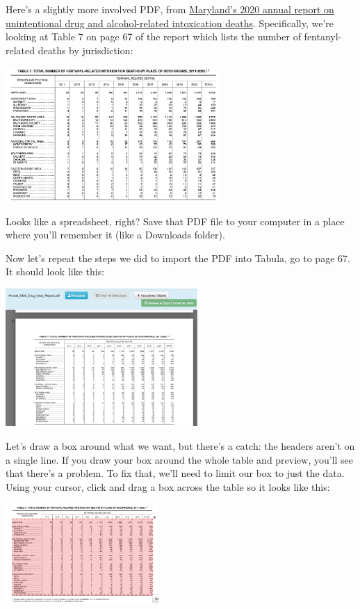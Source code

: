 \documentclass[
  letterpaper,
  DIV=11,
  numbers=noendperiod]{scrreprt}
\begin{document}
Here's a slightly more involved PDF, from
\href{https://health.maryland.gov/vsa/Documents/Overdose/Annual_2020_Drug_Intox_Report.pdf}{Maryland's
2020 annual report on unintentional drug and alcohol-related
intoxication deaths}. Specifically, we're looking at Table 7 on page 67
of the report which lists the number of fentanyl-related deaths by
jurisdiction:

\includegraphics[width=3.2in,height=\textheight]{./images/md_fentanyl_deaths_1.png}

Looks like a spreadsheet, right? Save that PDF file to your computer in
a place where you'll remember it (like a Downloads folder).

Now let's repeat the steps we did to import the PDF into Tabula, go to
page 67. It should look like this:

\includegraphics[width=2.88in,height=\textheight]{./images/md_fentanyl_deaths_2.png}

Let's draw a box around what we want, but there's a catch: the headers
aren't on a single line. If you draw your box around the whole table and
preview, you'll see that there's a problem. To fix that, we'll need to
limit our box to just the data. Using your cursor, click and drag a box
across the table so it looks like this:

\includegraphics[width=2.29in,height=\textheight]{./images/md_fentanyl_deaths_3.png}
\end{document}
